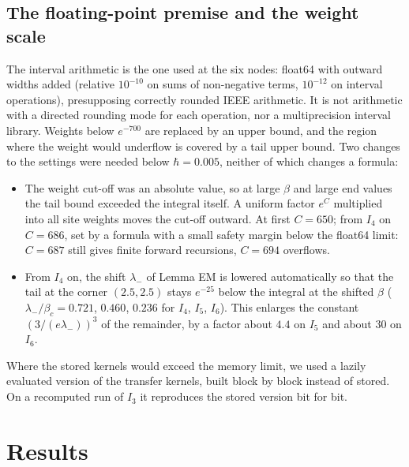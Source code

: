 \documentclass[11pt,a4paper]{article}
\theoremstyle{definition}
\theoremstyle{remark}
\begin{document}
\subsection{The floating-point premise and the weight scale}\label{sec:fp}

The interval arithmetic is the one used at the six nodes: float64 with outward widths added (relative $10^{-10}$ on sums of non-negative terms, $10^{-12}$ on interval operations), presupposing correctly rounded IEEE arithmetic. It is not arithmetic with a directed rounding mode for each operation, nor a multiprecision interval library. Weights below $e^{-700}$ are replaced by an upper bound, and the region where the weight would underflow is covered by a tail upper bound. Two changes to the settings were needed below $\hbar=0.005$, neither of which changes a formula:
\begin{itemize}[leftmargin=2em]
\item The weight cut-off was an absolute value, so at large $\beta$ and large end values the tail bound exceeded the integral itself. A uniform factor $e^{C}$ multiplied into all site weights moves the cut-off outward. At first $C=650$; from $I_4$ on $C=686$, set by a formula with a small safety margin below the float64 limit: $C=687$ still gives finite forward recursions, $C=694$ overflows.
\item From $I_4$ on, the shift $\lambda_-$ of Lemma EM is lowered automatically so that the tail at the corner $(2.5,2.5)$ stays $e^{-25}$ below the integral at the shifted $\beta$ ($\lambda_-/\beta_c=0.721$, $0.460$, $0.236$ for $I_4$, $I_5$, $I_6$). This enlarges the constant $(3/(e\lambda_-))^3$ of the remainder, by a factor about $4.4$ on $I_5$ and about $30$ on $I_6$.
\end{itemize}
Where the stored kernels would exceed the memory limit, we used a lazily evaluated version of the transfer kernels, built block by block instead of stored. On a recomputed run of $I_3$ it reproduces the stored version bit for bit.

\section{Results}\label{sec:results}
\end{document}
